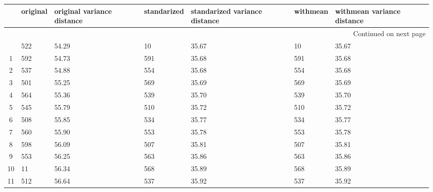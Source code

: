 \begin{longtable}{cp{2cm}p{2cm}p{2cm}p{2cm}p{2cm}p{2cm}}
\toprule
{} &  original &  original variance distance &  standarized &  standarized variance distance &  withmean &  withmean variance distance \\
\midrule
\endhead
\midrule
\multicolumn{7}{r}{{Continued on next page}} \\
\midrule
\endfoot

\bottomrule
\endlastfoot
0  &       522 &                       54.29 &           10 &                          35.67 &        10 &                       35.67 \\
1  &       592 &                       54.73 &          591 &                          35.68 &       591 &                       35.68 \\
2  &       537 &                       54.88 &          554 &                          35.68 &       554 &                       35.68 \\
3  &       501 &                       55.25 &          569 &                          35.69 &       569 &                       35.69 \\
4  &       564 &                       55.36 &          539 &                          35.70 &       539 &                       35.70 \\
5  &       545 &                       55.79 &          510 &                          35.72 &       510 &                       35.72 \\
6  &       508 &                       55.85 &          534 &                          35.77 &       534 &                       35.77 \\
7  &       560 &                       55.90 &          553 &                          35.78 &       553 &                       35.78 \\
8  &       598 &                       56.09 &          507 &                          35.81 &       507 &                       35.81 \\
9  &       553 &                       56.25 &          563 &                          35.86 &       563 &                       35.86 \\
10 &        11 &                       56.34 &          568 &                          35.89 &       568 &                       35.89 \\
11 &       512 &                       56.64 &          537 &                          35.92 &       537 &                       35.92 \\

\end{longtable}
